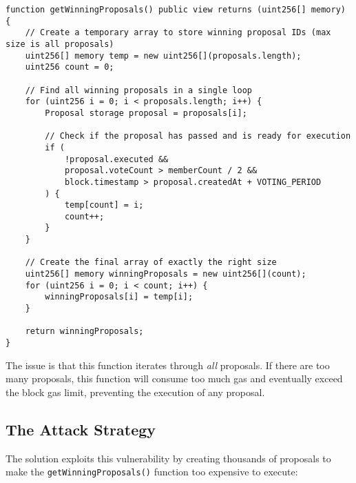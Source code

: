 \documentclass[12pt]{article}
\begin{document}
\begin{lstlisting}[language=Solidity]
function getWinningProposals() public view returns (uint256[] memory) {
    // Create a temporary array to store winning proposal IDs (max size is all proposals)
    uint256[] memory temp = new uint256[](proposals.length);
    uint256 count = 0;

    // Find all winning proposals in a single loop
    for (uint256 i = 0; i < proposals.length; i++) {
        Proposal storage proposal = proposals[i];

        // Check if the proposal has passed and is ready for execution
        if (
            !proposal.executed &&
            proposal.voteCount > memberCount / 2 &&
            block.timestamp > proposal.createdAt + VOTING_PERIOD
        ) {
            temp[count] = i;
            count++;
        }
    }

    // Create the final array of exactly the right size
    uint256[] memory winningProposals = new uint256[](count);
    for (uint256 i = 0; i < count; i++) {
        winningProposals[i] = temp[i];
    }

    return winningProposals;
}
\end{lstlisting}

The issue is that this function iterates through \textit{all} proposals. If there are too many proposals, this function will consume too much gas and eventually exceed the block gas limit, preventing the execution of any proposal.

\subsection*{The Attack Strategy}

The solution exploits this vulnerability by creating thousands of proposals to make the \texttt{getWinningProposals()} function too expensive to execute:
\end{document}
